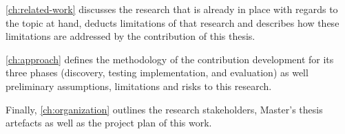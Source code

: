 	\autoref{ch:related-work} discusses the research that is already in place with regards to the topic at hand, deducts limitations of that research and describes how these limitations are addressed by the contribution of this thesis.
	
	\autoref{ch:approach} defines the methodology of the contribution development for its three phases (discovery, testing implementation, and evaluation) as well preliminary assumptions, limitations and risks to this research.
	
	Finally, \autoref{ch:organization} outlines the research stakeholders, Master's thesis artefacts as well as the project plan of this work.
		
%	
%	
%	
%	
%	

